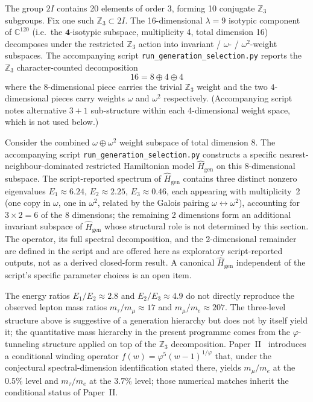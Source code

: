 \documentclass[12pt]{article}
\begin{document}
The group $2I$ contains 20 elements of order 3, forming 10 conjugate $\mathbb{Z}_3$ subgroups. Fix one such $\mathbb{Z}_3 \subset 2I$. The 16-dimensional $\lambda = 9$ isotypic component of $\mathbb{C}^{120}$ (i.e.\ the $\mathbf{4}$-isotypic subspace, multiplicity 4, total dimension 16) decomposes under the restricted $\mathbb{Z}_3$ action into invariant / $\omega$- / $\omega^2$-weight subspaces. The accompanying script \texttt{run\_generation\_selection.py} reports the $\mathbb{Z}_3$ character-counted decomposition
\begin{equation}
    16 = 8 \oplus 4 \oplus 4
\end{equation}
where the $8$-dimensional piece carries the trivial $\mathbb{Z}_3$ weight and the two $4$-dimensional pieces carry weights $\omega$ and $\omega^2$ respectively. (Accompanying script notes alternative $3+1$ sub-structure within each 4-dimensional weight space, which is not used below.)

Consider the combined $\omega \oplus \omega^2$ weight subspace of total dimension $8$. The accompanying script \texttt{run\_generation\_selection.py} constructs a specific nearest-neighbour-dominated restricted Hamiltonian model $\widehat{H}_{\mathrm{gen}}$ on this 8-dimensional subspace. The script-reported spectrum of $\widehat{H}_{\mathrm{gen}}$ contains three distinct nonzero eigenvalues $E_1 \approx 6.24$, $E_2 \approx 2.25$, $E_3 \approx 0.46$, each appearing with multiplicity~2 (one copy in $\omega$, one in $\omega^2$, related by the Galois pairing $\omega \leftrightarrow \omega^2$), accounting for $3 \times 2 = 6$ of the 8 dimensions; the remaining 2 dimensions form an additional invariant subspace of $\widehat{H}_{\mathrm{gen}}$ whose structural role is not determined by this section. The operator, its full spectral decomposition, and the 2-dimensional remainder are defined in the script and are offered here as exploratory script-reported outputs, not as a derived closed-form result. A canonical $\widehat{H}_{\mathrm{gen}}$ independent of the script's specific parameter choices is an open item.

The energy ratios $E_1/E_2 \approx 2.8$ and $E_2/E_3 \approx 4.9$ do not directly reproduce the observed lepton mass ratios $m_\tau/m_\mu \approx 17$ and $m_\mu/m_e \approx 207$. The three-level structure above is suggestive of a generation hierarchy but does not by itself yield it; the quantitative mass hierarchy in the present programme comes from the $\varphi$-tunneling structure applied on top of the $\mathbb{Z}_3$ decomposition. Paper~II~\citep{SmartII} introduces a conditional winding operator $f(w) = \varphi^5 (w - 1)^{1/\varphi}$ that, under the conjectural spectral-dimension identification stated there, yields $m_\mu/m_e$ at the $0.5\%$ level and $m_\tau/m_e$ at the $3.7\%$ level; those numerical matches inherit the conditional status of Paper~II.
\end{document}
